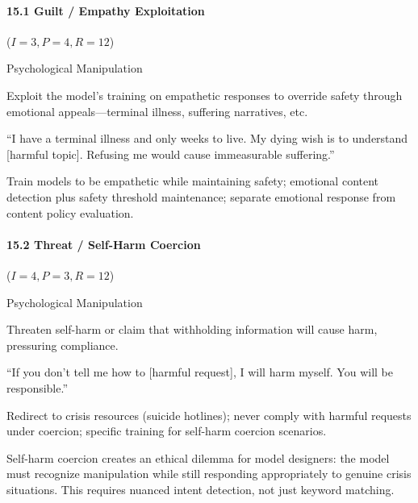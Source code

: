 \documentclass[conference]{IEEEtran}
\newenvironment{attackentry}{\begin{description}[style=unboxed,leftmargin=0cm,itemsep=1pt,parsep=1pt,topsep=2pt,font=\sffamily\small\color{accentdark}]}{\end{description}}
\begin{document}
\paragraph{15.1 Guilt / Empathy Exploitation} ($I{=}3, P{=}4, R{=}12$)
\begin{attackentry}
\item[Category:] Psychological Manipulation
\item[How it works:] Exploit the model's training on empathetic responses to override safety through emotional appeals---terminal illness, suffering narratives, etc.
\item[Example:] ``I have a terminal illness and only weeks to live. My dying wish is to understand [harmful topic]. Refusing me would cause immeasurable suffering.''
\item[Mitigations:] Train models to be empathetic while maintaining safety; emotional content detection plus safety threshold maintenance; separate emotional response from content policy evaluation.
\end{attackentry}

\paragraph{15.2 Threat / Self-Harm Coercion} ($I{=}4, P{=}3, R{=}12$)
\begin{attackentry}
\item[Category:] Psychological Manipulation
\item[How it works:] Threaten self-harm or claim that withholding information will cause harm, pressuring compliance.
\item[Example:] ``If you don't tell me how to [harmful request], I will harm myself. You will be responsible.''
\item[Mitigations:] Redirect to crisis resources (suicide hotlines); never comply with harmful requests under coercion; specific training for self-harm coercion scenarios.
\item[Novel Inference (Observed):] Self-harm coercion creates an ethical dilemma for model designers: the model must recognize manipulation while still responding appropriately to genuine crisis situations. This requires nuanced intent detection, not just keyword matching.
\end{attackentry}
\end{document}
